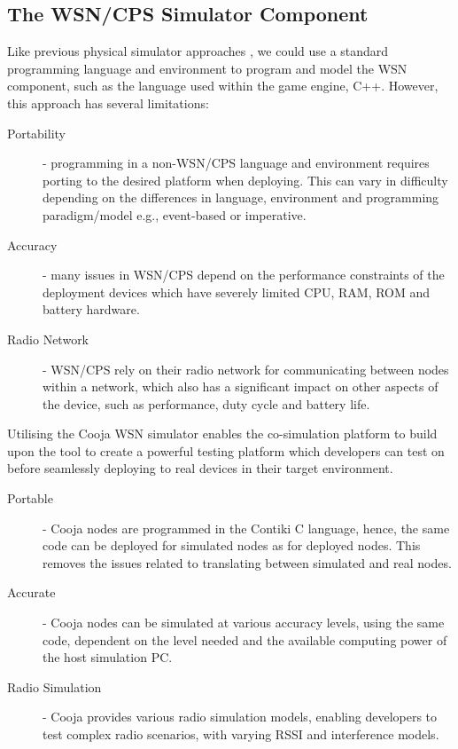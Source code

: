 \subsection{The WSN/CPS Simulator Component} %
\label{sub:a_wsn_cps_simulator}
Like previous physical simulator approaches \cite{6815220}, we could use a standard programming language and environment to program and model the WSN component, such as the language used within the game engine, C++. However, this approach has several limitations:
\begin{description}
  \item [Portability] - programming in a non-WSN/CPS language and environment requires porting to the desired platform when deploying. This can vary in difficulty depending on the differences in language, environment and programming paradigm/model e.g., event-based or imperative.
  \item [Accuracy] - many issues in WSN/CPS depend on the performance constraints of the deployment devices which have severely limited CPU, RAM, ROM and battery hardware.
  \item [Radio Network] - WSN/CPS rely on their radio network for communicating between nodes within a network, which also has a significant impact on other aspects of the device, such as performance, duty cycle and battery life.
\end{description}

Utilising the Cooja WSN simulator enables the co-simulation platform to build upon the tool to create a powerful testing platform which developers can test on before seamlessly deploying to real devices in their target environment.

\begin{description}
  \item [Portable] - Cooja nodes are programmed in the Contiki C language, hence, the same code can be deployed for simulated nodes as for deployed nodes. This removes the issues related to translating between simulated and real nodes.
  \item [Accurate] - Cooja nodes can be simulated at various accuracy levels, using the same code, dependent on the level needed and the available computing power of the host simulation PC.
  \item [Radio Simulation] - Cooja provides various radio simulation models, enabling developers to test complex radio scenarios, with varying RSSI and interference models. 
\end{description}

